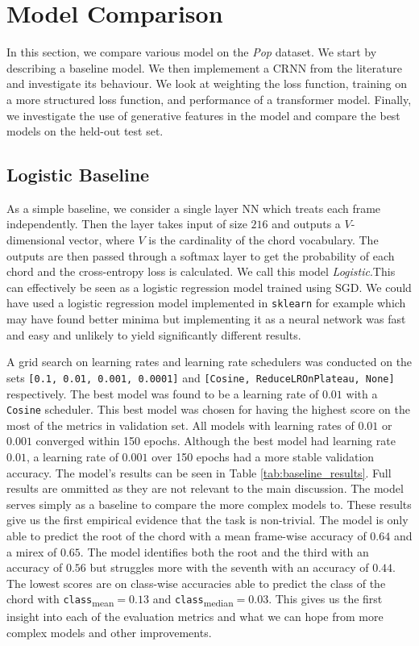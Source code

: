 \chapter{Model Comparison}

In this section, we compare various model on the \emph{Pop} dataset. We start by describing a baseline model. We then implemement a CRNN from the literature and investigate its behaviour. We look at weighting the loss function, training on a more structured loss function, and performance of a transformer model. Finally, we investigate the use of generative features in the model and compare the best models on the held-out test set.

\section{Logistic Baseline}

As a simple baseline, we consider a single layer NN which treats each frame independently. Then the layer takes input of size $216$ and outputs a $V$-dimensional vector, where $V$ is the cardinality of the chord vocabulary. The outputs are then passed through a softmax layer to get the probability of each chord and the cross-entropy loss is calculated. We call this model \emph{Logistic}.This can effectively be seen as a logistic regression model trained using SGD. We could have used a logistic regression model implemented in \texttt{sklearn} for example which may have found better minima but implementing it as a neural network was fast and easy and unlikely to yield significantly different results.

A grid search on learning rates and learning rate schedulers was conducted on the sets \texttt{[0.1, 0.01, 0.001, 0.0001]} and \texttt{[Cosine, ReduceLROnPlateau, None]} respectively. The best model was found to be a learning rate of $0.01$ with a \texttt{Cosine} scheduler. This best model was chosen for having the highest score on the most of the metrics in validation set. All models with learning rates of $0.01$ or $0.001$ converged within 150 epochs. Although the best model had learning rate $0.01$, a learning rate of $0.001$ over 150 epochs had a more stable validation accuracy. The model's results can be seen in Table \ref{tab:baseline_results}. Full results are ommitted as they are not relevant to the main discussion. The model serves simply as a baseline to compare the more complex models to. These results give us the first empirical evidence that the task is non-trivial. The model is only able to predict the root of the chord with a mean frame-wise accuracy of $0.64$ and a mirex of $0.65$. The model identifies both the root and the third with an accuracy of $0.56$ but struggles more with the seventh with an accuracy of $0.44$. The lowest scores are on class-wise accuracies able to predict the class of the chord with \texttt{class}\textsubscript{mean}$=0.13$ and \texttt{class}\textsubscript{median}$=0.03$. This gives us the first insight into each of the evaluation metrics and what we can hope from more complex models and other improvements.

